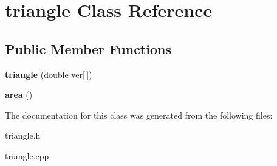 \hypertarget{classtriangle}{}\section{triangle Class Reference}
\label{classtriangle}
\subsection*{Public Member Functions}
\begin{DoxyCompactItemize}
\item 
\mbox{\label{classtriangle_aab2adac15175072954ef95e719e2b8d9}} 
{\bfseries triangle} (double ver\mbox{[}$\,$\mbox{]})
\item 
\mbox{\label{classtriangle_a6f475d3ad71d13bbb183ce93f3aec5d1}} 
{\bfseries area} ()
\end{DoxyCompactItemize}


The documentation for this class was generated from the following files\+:\begin{DoxyCompactItemize}
\item 
triangle.\+h\item 
triangle.\+cpp\end{DoxyCompactItemize}
